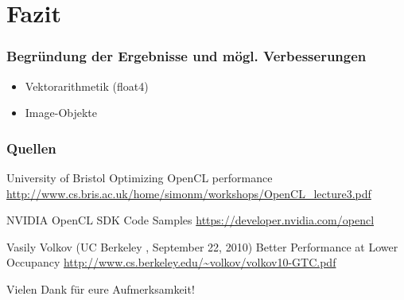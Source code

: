\documentclass{beamer}
\begin{document}
\section{Fazit}
\begin{frame}
\frametitle{Begr\"undung der Ergebnisse und m\"ogl. Verbesserungen}

\begin{itemize}
\item Vektorarithmetik (float4)
\item Image-Objekte
\end{itemize}

 
\end{frame}














\begin{frame}
\frametitle{Quellen}


\footnotesize{
\begin{thebibliography}{99}
  University of Bristol
 \newblock Optimizing OpenCL performance
 \newblock \url{http://www.cs.bris.ac.uk/home/simonm/workshops/OpenCL_lecture3.pdf} 
\end{thebibliography}
}



\footnotesize{
\begin{thebibliography}{99}
 NVIDIA 
 \newblock OpenCL SDK Code Samples
 \newblock \url{https://developer.nvidia.com/opencl} 
\end{thebibliography}
}


\footnotesize{
\begin{thebibliography}{99}
  Vasily Volkov
(UC Berkeley , September 22, 2010)
 \newblock Better Performance at Lower Occupancy 
 \newblock \url{http://www.cs.berkeley.edu/~volkov/volkov10-GTC.pdf} 
\end{thebibliography}
}





\end{frame}
 
 
 
\begin{frame}
\centerline{Vielen Dank f{\"u}r eure Aufmerksamkeit!}
\end{frame}
\end{document}
